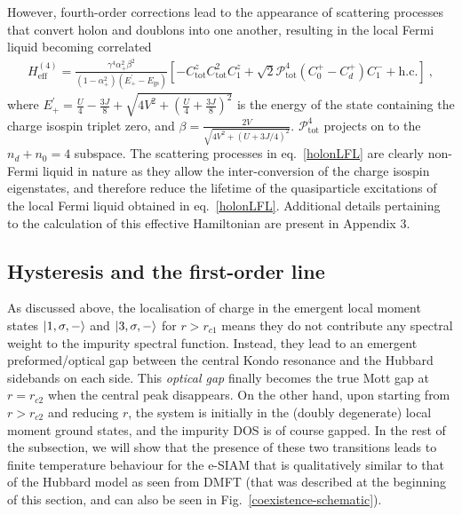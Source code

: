 However, fourth-order corrections lead to the appearance of scattering processes that convert holon and doublons into one another, resulting in the local Fermi liquid becoming correlated
\begin{eqnarray}
	H_\text{eff}^{(4)} = \frac{\gamma^4 \alpha_+^2 \beta^2}{\left( 1 - \alpha_+^2 \right) \left( E_+^\prime - E_\text{gs} \right) } \left[- C_\text{tot}^z C_\text{tot}^2 C_1^z + \sqrt{2}\mathcal{P}_\text{tot}^{4}\left(C_0^+ - C_d^+\right)C_1^- + \text{h.c.}\right]~,\label{holonLFL}
\end{eqnarray}
where \(E_+^\prime = \frac{U}{4} - \frac{3J}{8} + \sqrt{4V^2 + \left(\frac{U}{4} + \frac{3J}{8}\right)^2}\) is the energy of the state containing the charge isospin triplet zero, and \(\beta = \frac{2V}{\sqrt{4V^2 + \left(U + 3J/4\right)^2}}\). \(\mathcal{P}^4_\text{tot}\) projects on to the \(n_d + n_0 = 4\) subspace.
The scattering processes in eq.~\eqref{holonLFL} are clearly non-Fermi liquid in nature as they allow the inter-conversion of the charge isospin eigenstates, and therefore reduce the lifetime of the quasiparticle excitations of the local Fermi liquid obtained in eq.~\eqref{holonLFL}. Additional details pertaining to the calculation of this effective Hamiltonian are present in Appendix 3.

\subsection{Hysteresis and the first-order line}

As discussed above, the localisation of charge in the emergent local moment states \(\ket{1,\sigma,-}\) and \(\ket{3,\sigma,-}\) for \(r > r_{c1}\) means they do not contribute any spectral weight to the impurity spectral function. Instead, they lead to an emergent preformed/optical gap between the central Kondo resonance and the Hubbard sidebands on each side. This {\it optical gap} finally becomes the true Mott gap at \(r = r_{c2}\) when the central peak disappears.
On the other hand, upon starting from \(r > r_{c2}\) and reducing \(r\), the system is initially in the (doubly degenerate) local moment ground states, and the impurity DOS is of course gapped. In the rest of the subsection, we will show that the presence of these two transitions leads to finite temperature behaviour for the e-SIAM that is qualitatively similar to that of the Hubbard model as seen from DMFT (that was described at the beginning of this section, and can also be seen in Fig.~\ref{coexistence-schematic}).

